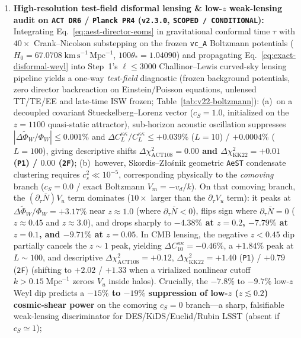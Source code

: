 \documentclass[11pt,a4paper]{article}
\begin{document}
\begin{enumerate}
    \item \textbf{High-resolution test-field disformal lensing \& low-$z$ weak-lensing audit on \texttt{ACT DR6} / \texttt{Planck PR4} (\texttt{v2.3.0}, \texttt{SCOPED / CONDITIONAL}):}
    Integrating Eq.~\eqref{eq:aest-director-eoms} in gravitational conformal time $\tau$ with $40\times$ Crank--Nicolson substepping on the frozen \texttt{vc\_A} Boltzmann potentials ($H_0 = 67.0708\;\mathrm{km\,s^{-1}\,Mpc^{-1}}$, $100\theta_* = 1.04090$) and propagating Eq.~\eqref{eq:exact-disformal-weyl} into Step~1's $\ell \le 3000$ Challinor--Lewis curved-sky lensing pipeline yields a one-way \emph{test-field} diagnostic (frozen background potentials, zero director backreaction on Einstein/Poisson equations, unlensed TT/TE/EE and late-time ISW frozen; Table~\ref{tab:v22-boltzmann}):
    (a)~on a decoupled covariant Stueckelberg--Lorenz vector ($c_S = 1.0$, initialized on the $z=1100$ quasi-static attractor), sub-horizon acoustic oscillation suppresses $|\Delta\tilde{\Phi}_W/\Phi_W| \le 0.001\%$ and $\Delta C_L^{\kappa\kappa}/C_L^{\kappa\kappa} \le +0.039\%$ ($L=10$) / $+0.0004\%$ ($L=100$), giving descriptive shifts \textbf{$\Delta\chi^2_{\mathrm{ACT108}} = 0.00$ and $\Delta\chi^2_{\mathrm{KK22}} = +0.01$ (\texttt{P1}) / $0.00$ (\texttt{2F})};
    (b)~however, Skordis--Z{\l}o\'snik geometric \texttt{AeST} condensate clustering requires $c_s^2 \ll 10^{-5}$, corresponding physically to the \emph{comoving} branch ($c_S = 0.0$ / exact Boltzmann $V_m = -v_d/k$). On that comoving branch, the $(\partial_\tau\bar{N}) V_u$ term dominates ($10\times$ larger than the $\partial_\tau V_u$ term): it peaks at $\Delta\tilde{\Phi}_W/\Phi_W = +3.17\%$ near $z \approx 1.0$ (where $\partial_\tau\bar{N} < 0$), flips sign where $\partial_\tau\bar{N} = 0$ ($z \approx 0.45$ and $z \approx 3.0$), and drops sharply to \textbf{$-4.38\%$ at $z = 0.2$, $-7.79\%$ at $z = 0.1$, and $-9.71\%$ at $z = 0.05$}. In CMB lensing, the negative $z < 0.45$ dip partially cancels the $z \sim 1$ peak, yielding $\Delta C_{10}^{\kappa\kappa} = -0.46\%$, a $+1.84\%$ peak at $L \sim 100$, and descriptive $\Delta\chi^2_{\mathrm{ACT108}} = +0.12$, $\Delta\chi^2_{\mathrm{KK22}} = +1.40$ (\texttt{P1}) / $+0.79$ (\texttt{2F}) (shifting to $+2.02$ / $+1.33$ when a virialized nonlinear cutoff $k > 0.15\;\mathrm{Mpc}^{-1}$ zeroes $V_u$ inside halos). Crucially, the $-7.8\%$ to $-9.7\%$ low-$z$ Weyl dip predicts a \textbf{$-15\%$ to $-19\%$ suppression of low-$z$ ($z \lesssim 0.2$) cosmic-shear power} on the comoving $c_S = 0$ branch---a sharp, falsifiable weak-lensing discriminator for DES/KiDS/Euclid/Rubin LSST (absent if $c_S \simeq 1$);

\end{enumerate}
\end{document}
